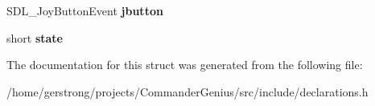 \begin{DoxyCompactItemize}
\item 
\hypertarget{structst_command_abb86f0fd053767a8df558f2a2413e871}{
SDL\_\-JoyButtonEvent {\bfseries jbutton}}
\label{structst_command_abb86f0fd053767a8df558f2a2413e871}

\item 
\hypertarget{structst_command_a7f469614d4b0bf98bcfec3b54e4946e3}{
short {\bfseries state}}
\label{structst_command_a7f469614d4b0bf98bcfec3b54e4946e3}

\end{DoxyCompactItemize}


The documentation for this struct was generated from the following file:\begin{DoxyCompactItemize}
\item 
/home/gerstrong/projects/CommanderGenius/src/include/declarations.h\end{DoxyCompactItemize}
